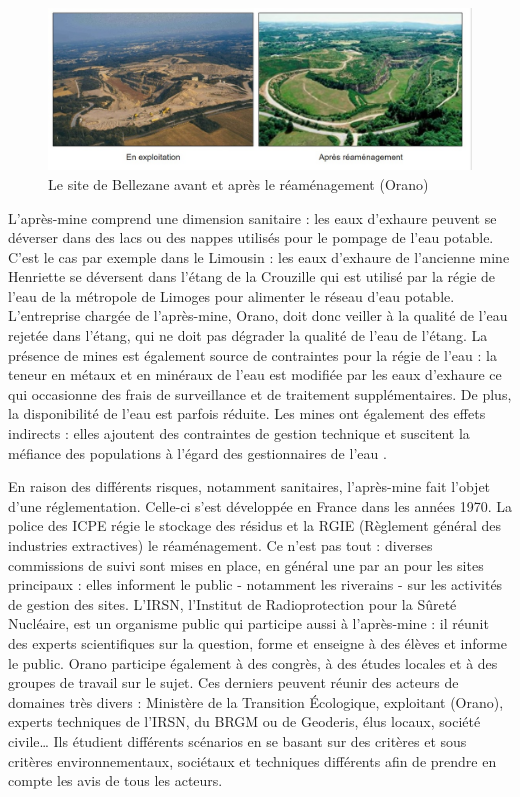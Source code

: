 \documentclass{article}
\begin{document}
\begin{figure}[H]
    \centering
    \includegraphics[width=\linewidth]{I_B_2.jpg}
    \caption{Le site de Bellezane avant et après le réaménagement (Orano)}
    \label{fig:bellezane_avant_apres}
\end{figure}

L’après-mine comprend une dimension sanitaire : les eaux d’exhaure peuvent se déverser dans des lacs ou des nappes utilisés pour le pompage de l’eau potable. C’est le cas par exemple dans le Limousin : les eaux d’exhaure de l’ancienne mine Henriette se déversent dans l’étang de la Crouzille qui est utilisé par la régie de l’eau de la métropole de Limoges pour alimenter le réseau d’eau potable. L’entreprise chargée de l’après-mine, Orano, doit donc veiller à la qualité de l’eau rejetée dans l’étang, qui ne doit pas dégrader la qualité de l’eau de l’étang. La présence de mines est également source de contraintes pour la régie de l’eau : la teneur en métaux et en minéraux de l’eau est modifiée par les eaux d’exhaure ce qui occasionne des frais de surveillance et de traitement supplémentaires. De plus, la disponibilité de l’eau est parfois réduite. Les mines ont également des effets indirects : elles ajoutent des contraintes de gestion technique et suscitent la méfiance des populations à l’égard des gestionnaires de l’eau \cite{vialleseche_station_2020}.

En raison des différents risques, notamment sanitaires, l’après-mine fait l’objet d’une réglementation. Celle-ci s’est développée en France dans les années 1970.
 La police des ICPE régie le stockage des résidus et la RGIE (Règlement général des industries extractives) le réaménagement. Ce n’est pas tout : diverses commissions de suivi sont mises en place, en général une par an pour les sites principaux : elles informent le public - notamment les riverains - sur les activités de gestion des sites.
L’IRSN, l’Institut de Radioprotection pour la Sûreté Nucléaire, est un organisme public qui participe aussi à l’après-mine : il réunit des experts scientifiques sur la question, forme et enseigne à des élèves et informe le public. Orano participe également à des congrès, à des études locales et à des groupes de travail sur le sujet. Ces derniers peuvent réunir des acteurs de domaines très divers : Ministère de la Transition Écologique, exploitant (Orano), experts techniques de l’IRSN, du BRGM ou de Geoderis, élus locaux, société civile… Ils étudient différents scénarios en se basant sur des critères et sous critères environnementaux, sociétaux et techniques différents afin de prendre en compte les avis de tous les acteurs.
\end{document}

